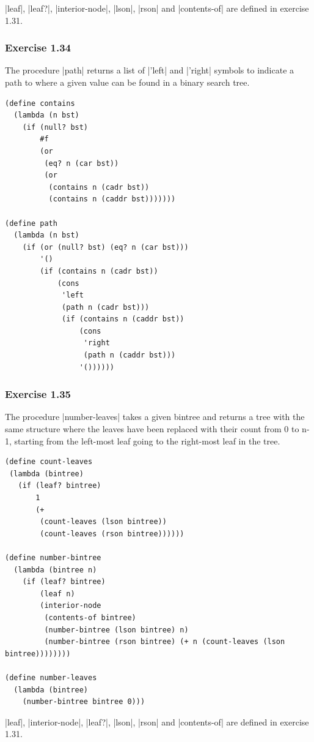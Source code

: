 \documentclass[a4paper]{article}
\begin{document}
|leaf|, |leaf?|, |interior-node|, |lson|, |rson| and |contents-of| are defined in exercise 1.31.

\subsubsection{Exercise 1.34}

The procedure |path| returns a list of |'left| and |'right| symbols to indicate a path to where a given value can be found in a binary search tree.

\begin{lstlisting}
(define contains
  (lambda (n bst)
    (if (null? bst)
        #f
        (or
         (eq? n (car bst))
         (or
          (contains n (cadr bst))
          (contains n (caddr bst)))))))

(define path
  (lambda (n bst)
    (if (or (null? bst) (eq? n (car bst)))
        '()
        (if (contains n (cadr bst))
            (cons
             'left
             (path n (cadr bst)))
             (if (contains n (caddr bst))
                 (cons
                  'right
                  (path n (caddr bst)))
                 '())))))
\end{lstlisting}

\subsubsection{Exercise 1.35}

The procedure |number-leaves| takes a given bintree and returns a tree with the same structure where the leaves have been replaced with their count from 0 to n-1, starting from the left-most leaf going to the right-most leaf in the tree.

\begin{lstlisting}
(define count-leaves
 (lambda (bintree)
   (if (leaf? bintree)
       1
       (+
        (count-leaves (lson bintree))
        (count-leaves (rson bintree))))))

(define number-bintree
  (lambda (bintree n)
    (if (leaf? bintree)
        (leaf n)
        (interior-node
         (contents-of bintree)
         (number-bintree (lson bintree) n)
         (number-bintree (rson bintree) (+ n (count-leaves (lson bintree))))))))

(define number-leaves
  (lambda (bintree)
    (number-bintree bintree 0)))
\end{lstlisting}

|leaf|, |interior-node|, |leaf?|, |lson|, |rson| and |contents-of| are defined in exercise 1.31.
\end{document}
